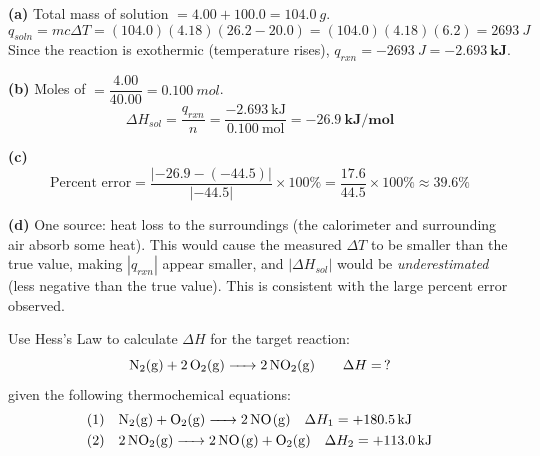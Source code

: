 \documentclass[addpoints]{exam}
\begin{document}
\begin{questions}
\begin{solution}[10cm]
\textbf{(a)} Total mass of solution $= 4.00 + 100.0 = \SI{104.0}{g}$.
\[
q_{soln} = mc\Delta T = (104.0)(4.18)(26.2 - 20.0) = (104.0)(4.18)(6.2) = \SI{2693}{J}
\]
Since the reaction is exothermic (temperature rises), $q_{rxn} = -\SI{2693}{J} = \mathbf{-2.693\ kJ}$.

\textbf{(b)} Moles of  $= \dfrac{4.00}{40.00} = \SI{0.100}{mol}$.
\[
\Delta H_{sol} = \frac{q_{rxn}}{n} = \frac{-2.693\ \text{kJ}}{0.100\ \text{mol}}
= \mathbf{-26.9\ kJ/mol}
\]

\textbf{(c)}
\[
\text{Percent error} = \frac{|{-26.9} - ({-44.5})|}{|-44.5|} \times 100\%
= \frac{17.6}{44.5} \times 100\% \approx \mathbf{39.6\%}
\]

\textbf{(d)} One source: heat loss to the surroundings (the calorimeter and surrounding air
absorb some heat). This would cause the measured $\Delta T$ to be smaller than the true value,
making $|q_{rxn}|$ appear smaller, and $|\Delta H_{sol}|$ would be \textit{underestimated}
(less negative than the true value). This is consistent with the large percent error observed.
\end{solution}

\question Use Hess's Law to calculate $\Delta H$ for the target reaction:
\[
\ce{N2(g) + 2O2(g) -> 2NO2(g)} \qquad \Delta H = \, ?
\]
given the following thermochemical equations:
\begin{align*}
\text{(1)}\quad & \ce{N2(g) + O2(g) -> 2NO(g)} \quad \Delta H_1 = +\SI{180.5}{kJ} \\
\text{(2)}\quad & \ce{2NO2(g) -> 2NO(g) + O2(g)} \quad \Delta H_2 = +\SI{113.0}{kJ}
\end{align*}
\end{questions}
\end{document}
